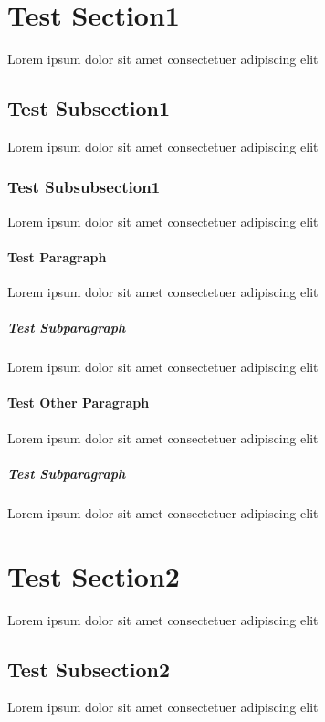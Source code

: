 \documentclass{article}
\begin{document}
\section{Test Section1}
Lorem ipsum dolor sit amet consectetuer adipiscing elit

\subsection{Test Subsection1}
Lorem ipsum dolor sit amet consectetuer adipiscing elit

\subsubsection{Test Subsubsection1}
Lorem ipsum dolor sit amet consectetuer adipiscing elit

\paragraph{Test Paragraph}
Lorem ipsum dolor sit amet consectetuer adipiscing elit

\subparagraph{Test Subparagraph} 
Lorem ipsum dolor sit amet consectetuer adipiscing elit

\paragraph{Test Other Paragraph}
Lorem ipsum dolor sit amet consectetuer adipiscing elit

\subparagraph{Test Subparagraph}

  Lorem ipsum dolor
  sit amet consectetuer adipiscing
  elit



\section{Test Section2}
Lorem ipsum dolor sit amet consectetuer adipiscing elit

\subsection{Test Subsection2}
Lorem ipsum dolor sit amet consectetuer adipiscing elit
\end{document}
